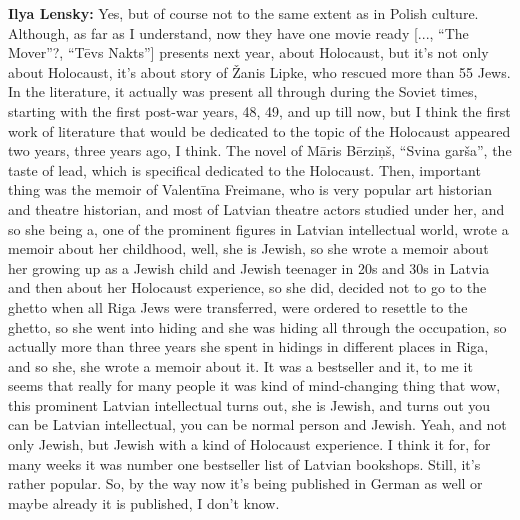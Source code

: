 \textbf{Ilya Lensky:} Yes, but of course not to the same extent as in Polish culture. Although, as far as I understand, now they have one movie ready [..., “The Mover”?, “Tēvs Nakts”] presents next year, about Holocaust, but it’s not only about Holocaust, it’s about story of Žanis Lipke, who rescued more than 55 Jews. In the literature, it actually was present all through during the Soviet times, starting with the first post-war years, 48, 49, and up till now, but I think the first work of literature that would be dedicated to the topic of the Holocaust appeared two years, three years ago, I think. The novel of Māris Bērziņš, “Svina garša”, the taste of lead, which is specifical dedicated to the Holocaust. Then, important thing was the memoir of Valentīna Freimane, who is very popular art historian and theatre historian, and most of Latvian theatre actors studied under her, and so she being a, one of the prominent figures in Latvian intellectual world, wrote a memoir about her childhood, well, she is Jewish, so she wrote a memoir about her growing up as a Jewish child and Jewish teenager in 20s and 30s in Latvia and then about her Holocaust experience, so she did, decided not to go to the ghetto when all Riga Jews were transferred, were ordered to resettle to the ghetto, so she went into hiding and she was hiding all through the occupation, so actually more than three years she spent in hidings in different places in Riga, and so she, she wrote a memoir about it. It was a bestseller and it, to me it seems that really for many people it was kind of mind-changing thing that wow, this prominent Latvian intellectual turns out, she is Jewish, and turns out you can be Latvian intellectual, you can be normal person and Jewish. Yeah, and not only Jewish, but Jewish with a kind of Holocaust experience. I think it for, for many weeks it was number one bestseller list of Latvian bookshops. Still, it’s rather popular. So, by the way now it’s being published in German as well or maybe already it is published, I don’t know. \\
